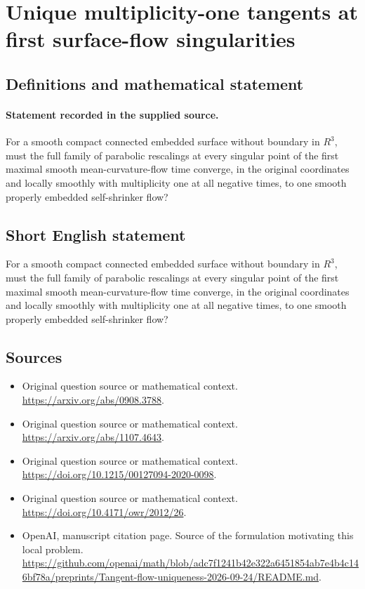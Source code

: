 \documentclass[11pt]{article}
\begin{document}
\section*{Unique multiplicity-one tangents at first surface-flow singularities}\label{30007141}
\subsection{Definitions and mathematical statement}
\paragraph{Statement recorded in the supplied source.}
For a smooth compact connected embedded surface without boundary in $R^{3}$, must the full family of parabolic rescalings at every singular point of the first maximal smooth mean-curvature-flow time converge, in the original coordinates and locally smoothly with multiplicity one at all negative times, to one smooth properly embedded self-shrinker flow?
\subsection{Short English statement}
For a smooth compact connected embedded surface without boundary in $R^{3}$, must the full family of parabolic rescalings at every singular point of the first maximal smooth mean-curvature-flow time converge, in the original coordinates and locally smoothly with multiplicity one at all negative times, to one smooth properly embedded self-shrinker flow?
\subsection{Sources}
\begin{itemize}
\item[S1] Original question source or mathematical context.
\url{https://arxiv.org/abs/0908.3788}.
\item[S2] Original question source or mathematical context.
\url{https://arxiv.org/abs/1107.4643}.
\item[S3] Original question source or mathematical context.
\url{https://doi.org/10.1215/00127094-2020-0098}.
\item[S4] Original question source or mathematical context.
\url{https://doi.org/10.4171/owr/2012/26}.
\item[S5] OpenAI, manuscript citation page. Source of the formulation motivating this local problem.
\url{https://github.com/openai/math/blob/adc7f1241b42e322a6451854ab7e4b4c146bf78a/preprints/Tangent-flow-uniqueness-2026-09-24/README.md}.
\end{itemize}
\end{document}
